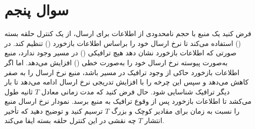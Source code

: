 \section{سوال پنجم}

فرض کنید یک منبع با حجم نامحدودی از اطلاعات برای ارسال، از یک کنترل حلقه بسته () استفاده می‌کند تا نرخ ارسال خود را براساس اطلاعات بازخورد () تنظیم کند. در صورتی که اطلاعات بازخورد نشان دهد هیچ ترافیکی () در مسیر وجود ندارد، منبع به‌صورت پیوسته نرخ ارسال خود را به‌صورت خطی () افزایش می‌دهد. اما اگر اطلاعات بازخورد حاکی از وجود ترافیک در مسیر باشد، منبع نرخ ارسال را به صفر کاهش می‌دهد و سپس این چرخه را با افزایش تدریجی نرخ ارسال ادامه می‌دهد تا بار دیگر ترافیک شناسایی شود. حال فرض کنید که مدت زمانی معادل $T$ ثانیه طول می‌کشد تا اطلاعات بازخورد پس از وقوع ترافیک به منبع برسد. نمودار نرخ ارسال منبع را نسبت به زمان برای مقادیر کوچک و بزرگ $T$ ترسیم کنید و توضیح دهید که تأخیر انتشار $T$  چه نقشی در این کنترل حلقه بسته ایفا می‌کند.